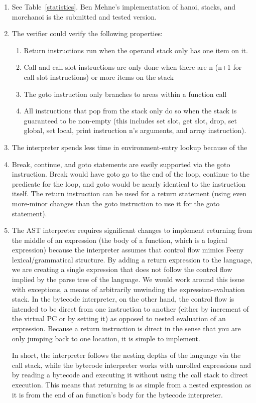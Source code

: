 \documentclass[notitlepage]{report}
\begin{document}
\begin{enumerate}
	\item
			See Table~\ref{statistics}.  Ben Mehne's implementation of hanoi, stacks, and morehanoi is the submitted and tested version.
	\item The verifier could verify the following properties:
		\begin{enumerate}
			\item Return instructions run when the operand stack only has one item on it.
			\item Call and call slot instructions are only done when there are n (n+1 for call slot instructions) or more items on the stack
			\item The goto instruction only branches to areas within a function call
			\item All instructions that pop from the stack only do so when the stack is guaranteed to be non-empty (this includes set slot, get slot, drop, set global, set local, print instruction n's arguments, and array instruction).
		\end{enumerate}

	\item The interpreter spends less time in environment-entry lookup because of the
	\item Break, continue, and goto statements are easily supported via the goto instruction.  Break would have goto go to the end of the loop, continue to the predicate for the loop, and goto would be nearly identical to the instruction itself.  The return instruction can be used for a return statement (using even more-minor changes than the goto instruction to use it for the goto statement).
	\item The AST interpreter requires significant changes to implement returning from the middle of an expression (the body of a function, which is a logical expression) because the interpreter assumes that control flow mimics Feeny lexical/grammatical structure.  By adding a return expression to the language, we are creating a single expression that does not follow the control flow implied by the parse tree of the language.  We would work around this issue with exceptions, a means of arbitrarily unwinding the expression-evaluation stack.  In the bytecode interpreter, on the other hand, the control flow is intended to be direct from one instruction to another (either by increment of the virtual PC or by setting it) as opposed to nested evaluation of an expression.  Because a return instruction is direct in the sense that you are only jumping back to one location, it is simple to implement.

		In short, the interpreter follows the nesting depths of the language via the call stack, while the bytecode interpreter works with unrolled expressions and by reading a bytecode and executing it without using the call stack to direct execution.  This means that returning is as simple from a nested expression as it is from the end of an function's body for the bytecode interpreter.
\end{enumerate}
\end{document}
